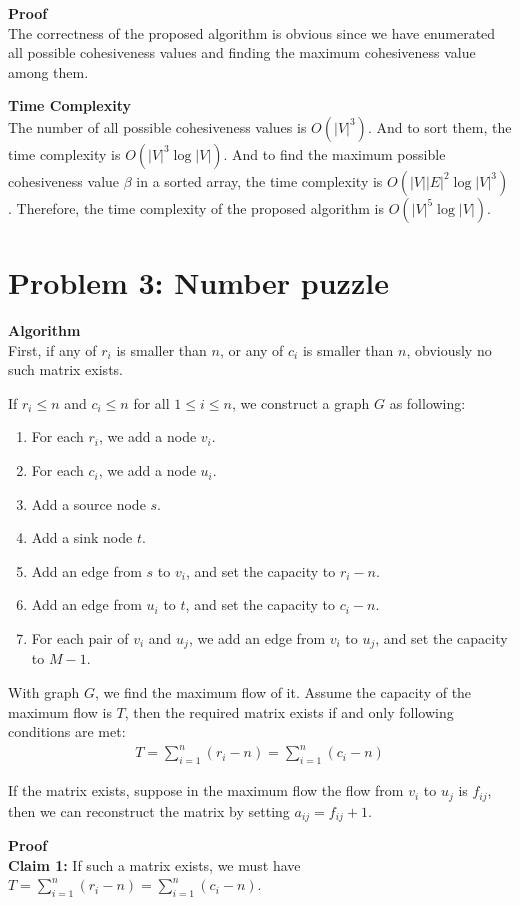 \documentclass{article}
\newcommand{\Complexity}{\vspace{0.3cm} \noindent\textbf{Time Complexity} \\}
\newcommand{\Proof}{\vspace{0.3cm} \noindent\textbf{Proof} \\}
\newcommand{\Algorithm}{\textbf{Algorithm} \\}
\begin{document}
\Proof
The correctness of the proposed algorithm is obvious since we have enumerated all possible
cohesiveness values
and finding the maximum cohesiveness value among them.

\Complexity
The number of all possible cohesiveness values is $O(|V|^3)$. And to sort them, the time complexity
is $O(|V|^3 \log |V|)$. And to find the maximum possible cohesiveness value $\beta$ in a sorted array, the
time complexity is $O(|V||E|^2 \log |V|^3 )$. Therefore, the time complexity of the proposed
algorithm is $O(|V|^5 \log |V|)$.

\section*{Problem 3: Number puzzle}
\Algorithm
First, if any of $r_i$  is smaller than $n$, or any of $c_i$ is smaller than $n$, obviously no such
matrix exists.

If $r_i \leq n$ and $c_i \leq n$ for all $1 \leq i \leq n$, we construct a graph $G$ as following:
\begin{enumerate}
  \item For each $r_i$, we add a node $v_i$.
  \item For each $c_i$, we add a node $u_i$.
  \item Add a source node $s$.
  \item Add a sink node $t$.
  \item Add an edge from $s$ to $v_i$, and set the capacity to $r_i - n$.
  \item Add an edge from $u_i$ to $t$, and set the capacity to $c_i - n$.
  \item For each pair of $v_i$ and $u_j$, we add an edge from $v_i$ to $u_j$, and set the capacity to
    $M-1$. 
\end{enumerate}

With graph $G$, we find the maximum flow of it. Assume the capacity of the maximum flow is $T$, then
the required matrix exists if and only following conditions are met:
\begin{align}
  T = \sum_{i=1}^{n} (r_i - n) = \sum_{i=1}^{n}(c_i - n)
\end{align}

If the matrix exists, suppose in the maximum flow the flow from $v_i$ to $u_j$ is $f_{ij}$, then we can reconstruct the
matrix by setting $a_{ij} = f_{ij} + 1$.


\Proof
\textbf{Claim 1:} If such a matrix exists, we must have $ T = \sum_{i=1}^{n} (r_i - n) =
\sum_{i=1}^{n}(c_i - n)$.
\end{document}
